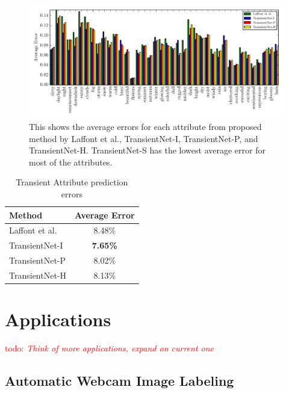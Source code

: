 \documentclass{article}
\newcommand{\todo}[1]{\textcolor{red}{todo: {\em #1}}}
\begin{document}
\begin{figure}[t]
	\centering
		\includegraphics[width=1.0\textwidth]{figs/avg_err_compare_cmr.pdf}
		\caption{This shows the average errors for each attribute from proposed method
						 by Laffont et al., TransientNet-I, TransientNet-P, and TransientNet-H.  
             TransientNet-S has the lowest average error for most of the attributes.}
		\label{fig:compare}
\end{figure}

\begin{table}[t]
	\centering
	\begin{tabular}{ | l | c | }
		\hline
			Method & Average Error \\ \hline
			Laffont et al.~\cite{Laffont14}& 8.48\% \\ \hline
			TransientNet-I & \textbf{7.65\%} \\ \hline
			TransientNet-P & 8.02\% \\ \hline
			TransientNet-H & 8.13\% \\ 
		\hline
	\end{tabular}
	\caption{Transient Attribute prediction errors}
	\label{tbl:transient}
\end{table}

\section{Applications}
\todo{Think of more applications, expand on current one}
\subsection{Automatic Webcam Image Labeling}
\indent
\end{document}
